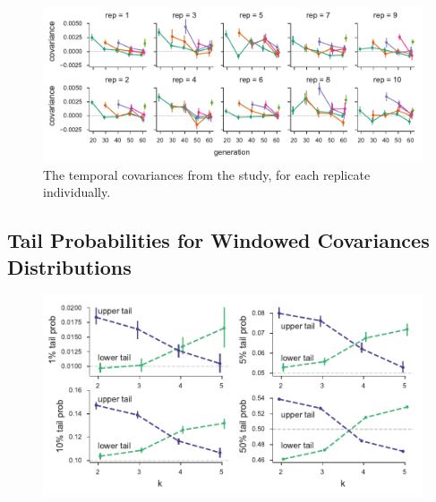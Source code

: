 \documentclass[11pt]{article}
\begin{document}
\begin{figure}[!ht]
  \centering
  \includegraphics[]{figures/barghi-cov-panels.pdf}

  \caption{The temporal covariances from the \textcite{Barghi2019-qy} study,
  for each replicate individually.}

  \label{suppfig:barghi-cov-panels}
\end{figure}



\subsection{\textcite{Barghi2019-qy} Tail Probabilities for Windowed Covariances Distributions}

\begin{figure}[!ht]
  \centering
  \includegraphics[]{figures/barghi-tailprobs-panels.pdf}
  \caption{}
  \label{suppfig:barghi-tailprobs-panels}
\end{figure}
\end{document}
